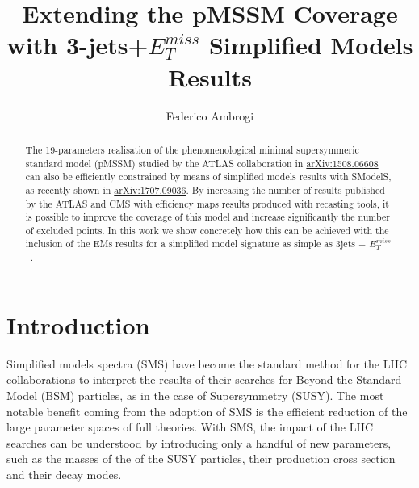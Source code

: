 \documentclass[a4paper,10pt]{article}
\title{\boldmath Extending the pMSSM Coverage with 3-jets+$E_T ^{miss}$ Simplified Models Results}
\author[a]{Federico Ambrogi}
\affiliation[a]{University of Vienna, Faculty of Physics, Bolzmanngasse 5, A-1090 Wien, Austria}
\newcommand{\SMO}{{\sc SModelS}}
\newcommand{\MET}{{ $E_T ^{miss}$}}
\newcommand{\TWO}{\twocolumn}
\begin{document}
 
\sffamily
\maketitle
\begin{abstract}
The 19-parameters realisation of the phenomenological minimal supersymmeric standard model (pMSSM) studied by the ATLAS collaboration in \href{https://arxiv.org/abs/1508.06608}{arXiv:1508.06608} can also be efficiently constrained by means of simplified models results with \SMO, as recently shown in \href{https://arxiv.org/abs/1707.09036}{arXiv:1707.09036}. By increasing the number of results published by  the ATLAS and CMS with efficiency maps results produced with recasting tools, it is possible to improve the coverage of this model and increase significantly the number of excluded points. In this work we show concretely how this can be achieved with the inclusion of the EMs results for a simplified model signature as simple as 3jets + \MET~.
\end{abstract}

\flushbottom



\sffamily
%
\TWO
%
\section{Introduction}
Simplified models spectra (SMS) have become the standard method for the LHC collaborations to interpret the results of their searches for Beyond the Standard Model (BSM) particles, as in the case of Supersymmetry (SUSY). The most notable benefit coming from the adoption of SMS is the efficient reduction of the large parameter spaces of full theories. With SMS, the impact of the LHC searches can be understood by introducing only a handful of new parameters, such as the masses of the of the SUSY particles, their production cross section and their decay modes. \\
\end{document}
